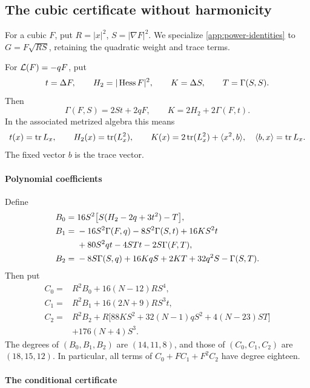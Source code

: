\subsection{The cubic certificate without harmonicity}
\label{app:nonharmonic-cubic-certificate}

For a cubic \(F\), put \(R=|x|^2\), \(S=|\nabla F|^2\).
We specialize \cref{app:power-identities} to \(G=F\sqrt{RS}\),
retaining the quadratic weight and trace terms.

For \(\mathcal L(F)=-qF\), put
\[
 t=\Delta F,\qquad H_2=|\operatorname{Hess} F|^2,\qquad K=\Delta S,
 \qquad T=\Gamma(S,S).
\]
Then
\begin{equation}\label{eq:cubic-nonharmonic-basic}
 \Gamma(F,S)=2St+2qF,\qquad K=2H_2+2\Gamma(F,t).
\end{equation}
In the associated metrized algebra this means
\[
 t(x)=\operatorname{tr} L_x,\qquad H_2(x)=\operatorname{tr}(L_x^2),\qquad
 K(x)=2\operatorname{tr}(L_x^2)+\langle x^2,b\rangle,
 \quad \langle b,x\rangle=\operatorname{tr} L_x.
\]
The fixed vector \(b\) is the trace vector.

\paragraph*{Polynomial coefficients}

Define
\begin{align}
 B_0={}&16S^2\bigl[S(H_2-2q+3t^2)-T\bigr],
 \label{eq:cubic-nonharmonic-B0}\\
 B_1={}&-16S^2\Gamma(F,q)-8S^2\Gamma(S,t)+16KS^2t\notag\\
       &+80S^2qt-4STt-2S\Gamma(F,T),
 \label{eq:cubic-nonharmonic-B1}\\
 B_2={}&-8S\Gamma(S,q)+16KqS+2KT+32q^2S-\Gamma(S,T).
 \label{eq:cubic-nonharmonic-B2}
\end{align}
Then put
\begin{equation}\label{eq:cubic-nonharmonic-coefficients}
\begin{aligned}
 C_0={}&R^2B_0+16(N-12)RS^4,\\
 C_1={}&R^2B_1+16(2N+9)RS^3t,\\
 C_2={}&R^2B_2
       +R\bigl[88KS^2+32(N-1)qS^2+4(N-23)ST\bigr]\\
       &+176(N+4)S^3.
\end{aligned}
\end{equation}
The degrees of \((B_0,B_1,B_2)\) are \((14,11,8)\), and those
of \((C_0,C_1,C_2)\) are \((18,15,12)\). In particular, all terms
of \(C_0+FC_1+F^2C_2\) have degree eighteen.

\paragraph*{The conditional certificate}

